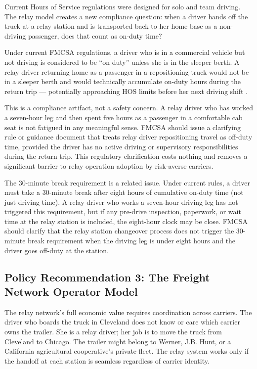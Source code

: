 Current Hours of Service regulations were designed for solo and team driving.
The relay model creates a new compliance question: when a driver hands off the truck
at a relay station and is transported back to her home base as a non-driving passenger,
does that count as on-duty time?

Under current FMCSA regulations, a driver who is in a commercial vehicle but not driving
is considered to be ``on duty'' unless she is in the sleeper berth. A relay driver
returning home as a passenger in a repositioning truck would not be in a sleeper berth
and would technically accumulate on-duty hours during the return trip --- potentially
approaching HOS limits before her next driving shift \citep{FHWA_freight2023}.

This is a compliance artifact, not a safety concern. A relay driver who has worked a
seven-hour leg and then spent five hours as a passenger in a comfortable cab seat is
not fatigued in any meaningful sense. FMCSA should issue a clarifying rule or guidance
document that treats relay driver repositioning travel as off-duty time, provided the
driver has no active driving or supervisory responsibilities during the return trip.
This regulatory clarification costs nothing and removes a significant barrier to relay
operation adoption by risk-averse carriers.

The 30-minute break requirement is a related issue. Under current rules, a driver must
take a 30-minute break after eight hours of cumulative on-duty time (not just driving time).
A relay driver who works a seven-hour driving leg has not triggered this requirement, but
if any pre-drive inspection, paperwork, or wait time at the relay station is included,
the eight-hour clock may be close. FMCSA should clarify that the relay station changeover
process does not trigger the 30-minute break requirement when the driving leg is under
eight hours and the driver goes off-duty at the station.

\subsection{Policy Recommendation 3: The Freight Network Operator Model}

The relay network's full economic value requires coordination across carriers. The driver
who boards the truck in Cleveland does not know or care which carrier owns the trailer.
She is a relay driver; her job is to move the truck from Cleveland to Chicago. The trailer
might belong to Werner, J.B. Hunt, or a California agricultural cooperative's private fleet.
The relay system works only if the handoff at each station is seamless regardless of
carrier identity.

